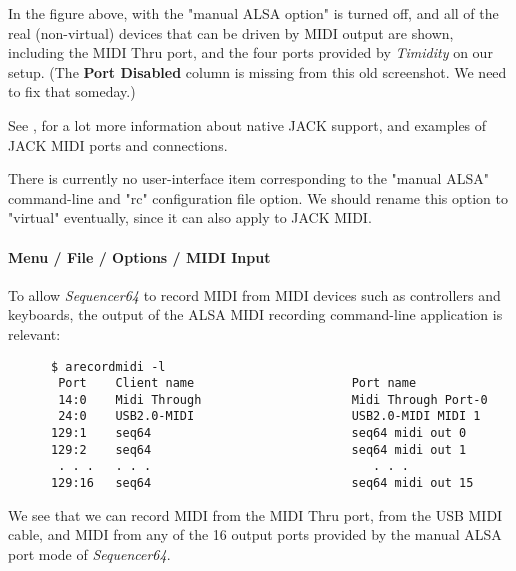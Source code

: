    In the figure above, with the "manual ALSA option" is turned off, and
   all of the real (non-virtual) devices that can be driven by MIDI output are
   shown, including the MIDI Thru port, and
   the four ports provided by \textsl{Timidity} on our setup.
   (The \textbf{Port Disabled} column is missing from this old screenshot.  We
   need to fix that someday.)

   See ,
   for a lot more information about native JACK support, and examples of JACK
   MIDI ports and connections.

   There is currently no user-interface item corresponding to the "manual ALSA"
   command-line and "rc" configuration file option.
   We should rename this option to "virtual"
   eventually, since it can also apply to JACK MIDI.

\paragraph{Menu / File / Options / MIDI Input}
\label{paragraph:seq64_menu_file_options_midi_input}

   To allow \textsl{Sequencer64} to record MIDI from MIDI devices such as
   controllers and keyboards, the output of the ALSA MIDI recording
   command-line application is relevant:

   \begin{verbatim}
      $ arecordmidi -l
       Port    Client name                      Port name
       14:0    Midi Through                     Midi Through Port-0
       24:0    USB2.0-MIDI                      USB2.0-MIDI MIDI 1
      129:1    seq64                            seq64 midi out 0
      129:2    seq64                            seq64 midi out 1
       . . .   . . .                               . . .
      129:16   seq64                            seq64 midi out 15
   \end{verbatim}


   We see that we can record MIDI from the MIDI Thru port, from the USB MIDI
   cable, and MIDI from any of the 16 output ports provided by the manual ALSA
   port mode of \textsl{Sequencer64}.

